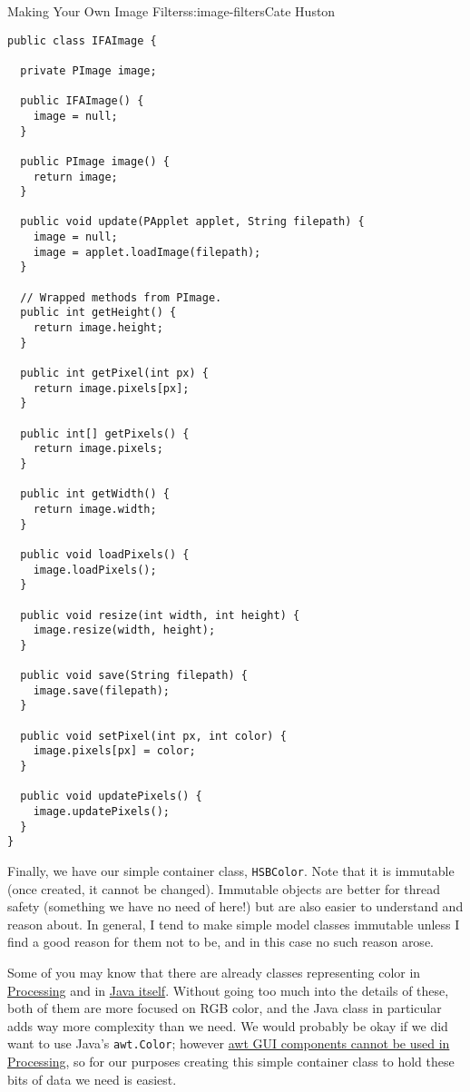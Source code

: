 \begin{aosachapter}{Making Your Own Image Filters}{s:image-filters}{Cate Huston}
\begin{verbatim}
public class IFAImage {

  private PImage image;

  public IFAImage() {
    image = null;
  }

  public PImage image() {
    return image;
  }

  public void update(PApplet applet, String filepath) {
    image = null;
    image = applet.loadImage(filepath);
  }

  // Wrapped methods from PImage.
  public int getHeight() {
    return image.height;
  }

  public int getPixel(int px) {
    return image.pixels[px];
  }

  public int[] getPixels() {
    return image.pixels;
  }

  public int getWidth() {
    return image.width;
  }

  public void loadPixels() {
    image.loadPixels();
  }

  public void resize(int width, int height) {
    image.resize(width, height);
  }

  public void save(String filepath) {
    image.save(filepath);
  }

  public void setPixel(int px, int color) {
    image.pixels[px] = color;
  }

  public void updatePixels() {
    image.updatePixels();
  }
}
\end{verbatim}

Finally, we have our simple container class, \texttt{HSBColor}. Note
that it is immutable (once created, it cannot be changed). Immutable
objects are better for thread safety (something we have no need of
here!) but are also easier to understand and reason about. In general, I
tend to make simple model classes immutable unless I find a good reason
for them not to be, and in this case no such reason arose.

Some of you may know that there are already classes representing color
in
\href{https://www.processing.org/reference/color_datatype.html}{Processing}
and in
\href{https://docs.oracle.com/javase/7/docs/api/java/awt/Color.html}{Java
itself}. Without going too much into the details of these, both of them
are more focused on RGB color, and the Java class in particular adds way
more complexity than we need. We would probably be okay if we did want
to use Java's \texttt{awt.Color}; however
\href{http://processing.org/reference/javadoc/core/processing/core/PApplet.html}{awt
GUI components cannot be used in Processing}, so for our purposes
creating this simple container class to hold these bits of data we need
is easiest.


\end{aosachapter}
